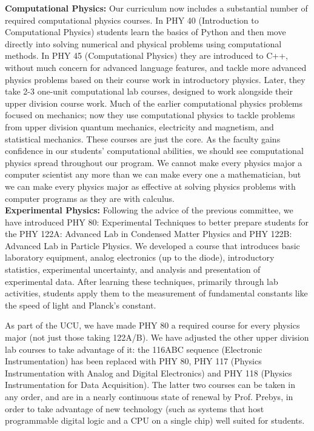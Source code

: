 \documentclass[12pt]{article}
\begin{document}
\noindent
{\bf Computational Physics:} Our curriculum now includes a substantial
number of required computational physics courses.  In PHY 40
(Introduction to Computational Physics) students learn the basics of
Python and then move directly into solving numerical and physical
problems using computational methods.  In PHY 45 (Computational
Physics) they are introduced to C++, without much concern for advanced
language features, and tackle more advanced physics problems based on
their course work in introductory physics.  Later, they take 2-3
one-unit computational lab courses, designed to work alongside their
upper division course work.  Much of the earlier computational physics
problems focused on mechanics; now they use computational physics to
tackle problems from upper division quantum mechanics, electricity and
magnetism, and statistical mechanics. These courses are just the core.
As the faculty gains confidence in our students' computational
abilities, we should see computational physics spread throughout our
program.  We cannot make every physics major a computer scientist any
more than we can make every one a mathematician, but we can make every
physics major as effective at solving physics problems with computer
programs as they are with calculus.\\[3pt]

\noindent
{\bf Experimental Physics:} Following the advice of the previous
committee, we have introduced PHY 80: Experimental Techniques to
better prepare students for the PHY 122A: Advanced Lab in Condensed
Matter Physics and PHY 122B: Advanced Lab in Particle Physics.  We
developed a course that introduces basic laboratory equipment, analog
electronics (up to the diode), introductory statistics, experimental
uncertainty, and analysis and presentation of experimental data.
After learning these techniques, primarily through lab activities,
students apply them to the measurement of fundamental constants like
the speed of light and Planck's constant.

As part of the UCU, we have made PHY 80 a required course for every
physics major (not just those taking 122A/B).  We have adjusted the
other upper division lab courses to take advantage of it: the 116ABC
sequence (Electronic Instrumentation) has been replaced with PHY 80,
PHY 117 (Physics Instrumentation with Analog and Digital Electronics)
and PHY 118 (Physics Instrumentation for Data Acquisition).  The latter
two courses can be taken in any order, and are in a nearly continuous
state of renewal by Prof. Prebys, in order to take advantage of new
technology (such as systems that host programmable digital logic and a
CPU on a single chip) well suited for students.
\end{document}
